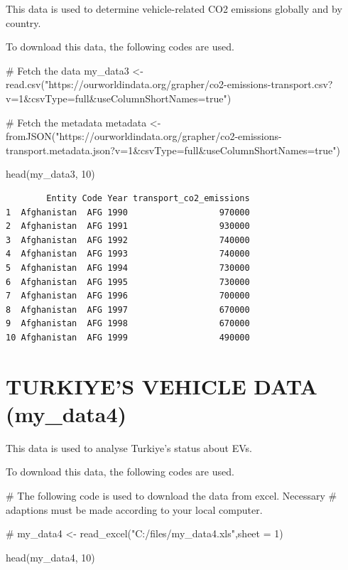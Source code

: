 \documentclass[
  11pt,
  a4paper,
  DIV=11,
  numbers=noendperiod]{scrartcl}
\newenvironment{Shaded}{\begin{snugshade}}{\end{snugshade}}
\newcommand{\CommentTok}[1]{\textcolor[rgb]{0.37,0.37,0.37}{#1}}
\newcommand{\DecValTok}[1]{\textcolor[rgb]{0.68,0.00,0.00}{#1}}
\newcommand{\FunctionTok}[1]{\textcolor[rgb]{0.28,0.35,0.67}{#1}}
\newcommand{\NormalTok}[1]{\textcolor[rgb]{0.00,0.23,0.31}{#1}}
\newcommand{\OtherTok}[1]{\textcolor[rgb]{0.00,0.23,0.31}{#1}}
\newcommand{\StringTok}[1]{\textcolor[rgb]{0.13,0.47,0.30}{#1}}
\begin{document}
This data is used to determine vehicle-related CO2 emissions globally
and by country.

To download this data, the following codes are used.

\begin{Shaded}
\begin{Highlighting}[]
\CommentTok{\# Fetch the data}
\NormalTok{my\_data3 }\OtherTok{\textless{}{-}} \FunctionTok{read.csv}\NormalTok{(}\StringTok{"https://ourworldindata.org/grapher/co2{-}emissions{-}transport.csv?v=1\&csvType=full\&useColumnShortNames=true"}\NormalTok{)}

\CommentTok{\# Fetch the metadata}
\NormalTok{metadata }\OtherTok{\textless{}{-}} \FunctionTok{fromJSON}\NormalTok{(}\StringTok{"https://ourworldindata.org/grapher/co2{-}emissions{-}transport.metadata.json?v=1\&csvType=full\&useColumnShortNames=true"}\NormalTok{)}

\FunctionTok{head}\NormalTok{(my\_data3, }\DecValTok{10}\NormalTok{)}
\end{Highlighting}
\end{Shaded}

\begin{verbatim}
        Entity Code Year transport_co2_emissions
1  Afghanistan  AFG 1990                  970000
2  Afghanistan  AFG 1991                  930000
3  Afghanistan  AFG 1992                  740000
4  Afghanistan  AFG 1993                  740000
5  Afghanistan  AFG 1994                  730000
6  Afghanistan  AFG 1995                  730000
7  Afghanistan  AFG 1996                  700000
8  Afghanistan  AFG 1997                  670000
9  Afghanistan  AFG 1998                  670000
10 Afghanistan  AFG 1999                  490000
\end{verbatim}

\section{TURKIYE'S VEHICLE DATA
(my\_data4)}\label{turkiyes-vehicle-data-my_data4}

This data is used to analyse Turkiye's status about EVs.

To download this data, the following codes are used.

\begin{Shaded}
\begin{Highlighting}[]
\CommentTok{\# The following code is used to download the data from excel. Necessary}
\CommentTok{\# adaptions must be made according to your local computer. }

\CommentTok{\# my\_data4 \textless{}{-} read\_excel("C:/files/my\_data4.xls",sheet = 1)}

\FunctionTok{head}\NormalTok{(my\_data4, }\DecValTok{10}\NormalTok{)}
\end{Highlighting}
\end{Shaded}
\end{document}
